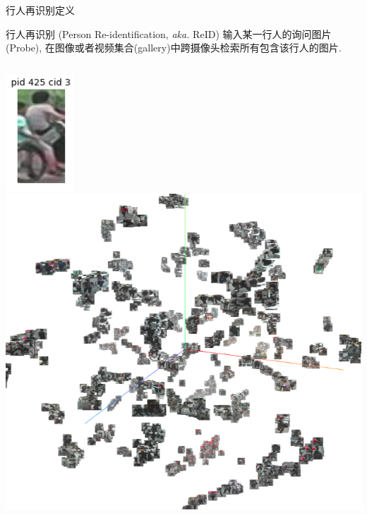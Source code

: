 \documentclass[notes]{beamer}
\begin{document}
\begin{frame}
	{行人再识别定义}
	\begin{block}{行人再识别 (Person Re-identification, \textit{aka.} ReID)}
		输入某一行人的询问图片(Probe), 在图像或者视频集合(gallery)中跨摄像头检索所有包含该行人的图片. 
	\end{block}
	\begin{columns}
		\centering 
		\includegraphics[width=0.5\linewidth]{2018-03-12-10-05-13.png}
		\centering
		\includegraphics[width=0.72\linewidth]{2018-03-12-09-57-11.png}
	\end{columns}
\end{frame}
\end{document}
